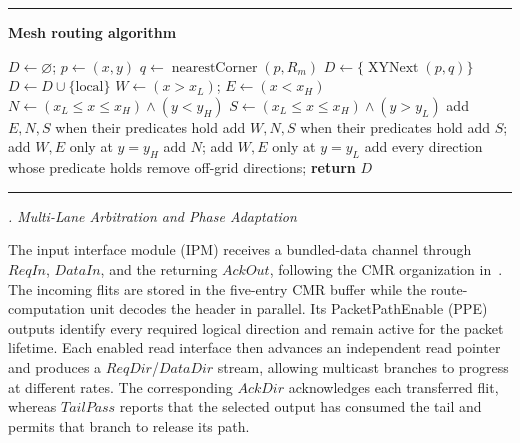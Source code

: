 \documentclass[conference]{IEEEtran}
\begin{document}
\par\noindent\hfill\begin{minipage}{0.96\columnwidth}
\hrule\vspace{2pt}
\scriptsize\textbf{Mesh routing algorithm}\vspace{-2pt}
\begin{algorithmic}[1]
\STATE $D\gets\varnothing$; $p\gets(x,y)$
  \STATE $q\gets\operatorname{nearestCorner}(p,R_m)$
  \STATE $D\gets\{\operatorname{XYNext}(p,q)\}$
\ELSE
   \STATE $D\gets D\cup\{\mathrm{local}\}$ \ENDIF
  \STATE $W\gets(x>x_L)$; $E\gets(x<x_H)$
  \STATE $N\gets(x_L\leq x\leq x_H)\land(y<y_H)$
  \STATE $S\gets(x_L\leq x\leq x_H)\land(y>y_L)$
   \STATE add $E,N,S$ when their predicates hold
   \STATE add $W,N,S$ when their predicates hold
   \STATE add $S$; add $W,E$ only at $y=y_H$
   \STATE add $N$; add $W,E$ only at $y=y_L$
  \ELSE \STATE add every direction whose predicate holds
  \ENDIF
\ENDIF
\STATE remove off-grid directions; \textbf{return} $D$
\end{algorithmic}
\vspace{2pt}\hrule
\end{minipage}\hfill\par

\par\vspace{6pt}
\noindent\textit{. Multi-Lane Arbitration and Phase Adaptation}%
\label{sec:multilane}
\par\vspace{4pt}

\begingroup
\setlength{\parskip}{0pt}
\setlength{\emergencystretch}{1.5em}

The input interface module (IPM) receives a bundled-data channel through
\(ReqIn\), \(DataIn\), and the returning \(AckOut\), following the CMR
organization in~\cite{bhardwaj2019cmr}. The incoming flits are stored in
the five-entry CMR buffer while the route-computation unit decodes the
header in parallel. Its PacketPathEnable (PPE) outputs identify every
required logical direction and remain active for the packet lifetime.
Each enabled read interface then advances an independent read pointer and
produces a \(ReqDir\)/\(DataDir\) stream, allowing multicast branches to
progress at different rates. The corresponding \(AckDir\) acknowledges
each transferred flit, whereas \(TailPass\) reports that the selected
output has consumed the tail and permits that branch to release its path.
\end{document}
